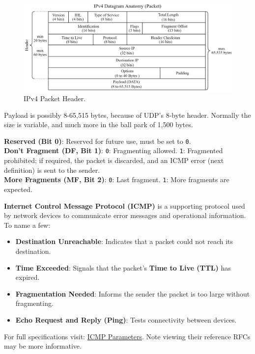 \newpage 


\begin{figure}[h!]
    \hspace{-2.5em}
    \includegraphics[width=1.1\textwidth]{Sections/network/datagram.png}
    \caption{IPv4 Packet Header.}
    \label{fig:ipv4_header}
\end{figure}

\noindent
Payload is possibly 8-65,515 bytes, because of UDP's 8-byte header. Normally the size is variable, and much more in 
the ball park of 1,500 bytes.
\begin{Def}

    
    \textbf{Reserved (Bit 0)}: Reserved for future use, must be set to \texttt{0}.\\
    \textbf{Don't Fragment (DF, Bit 1)}: \texttt{0}: Fragmenting allowed. 
    \texttt{1}: Fragmented prohibited; if required, the packet is discarded, and an ICMP error (next definition) is sent to the sender.\\
    \textbf{More Fragments (MF, Bit 2)}: \texttt{0}: Last fragment. \texttt{1}: More fragments are expected. \hfill \cite{rfc791}
    
\end{Def}


\begin{Def}

    \textbf{Internet Control Message Protocol (ICMP)} is a supporting protocol used by network devices to communicate error messages and operational information. To name a few:
    \begin{itemize}
        \item \textbf{Destination Unreachable}: Indicates that a packet could not reach its destination.
        \item \textbf{Time Exceeded}: Signals that the packet's \textbf{Time to Live (TTL)} has expired.
        \item \textbf{Fragmentation Needed}: Informs the sender the packet is too large without fragmenting.
        \item \textbf{Echo Request and Reply (Ping)}: Tests connectivity between devices. \hfill \cite{rfc792}
    \end{itemize}
    \noindent
    For full specifications visit: \href{https://www.iana.org/assignments/icmp-parameters/icmp-parameters.xhtml}{ICMP Parameters}. Note viewing their reference RFCs may be more informative.
\end{Def}


